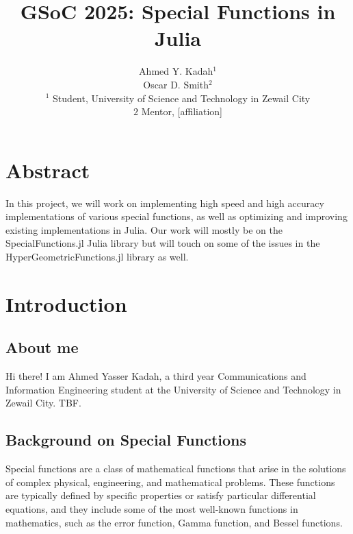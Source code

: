 \documentclass{article}
\title{GSoC 2025: Special Functions in Julia }
\author{Ahmed Y. Kadah$^1$  
\\Oscar D. Smith$^2$ 
\\$^1$ Student, University of Science and Technology in Zewail City
\\ $2$ Mentor, [affiliation]}
\date{}
\theoremstyle{mytheoremstyle}
\theoremstyle{mytheoremstyle}
\theoremstyle{myproblemstyle}
\begin{document}
    \maketitle


  \section*{Abstract}
    In this project, we will work on implementing high speed and high accuracy implementations of various special functions, as well as optimizing and improving existing implementations in Julia.
    Our work will mostly be on the SpecialFunctions.jl Julia library but will touch on some of the issues in the HyperGeometricFunctions.jl library as well. 

  \section*{Introduction}
    \subsection*{About me}\label{sub:About} 
      Hi there! I am Ahmed Yasser Kadah, a third year Communications and Information Engineering student at the University of Science and Technology in Zewail City. TBF. 

    \subsection*{Background on Special Functions}\label{sub:Background } %
   Special functions are a class of mathematical functions that arise in the solutions of complex physical, engineering, and mathematical problems.
   These functions are typically defined by specific properties or satisfy particular differential equations, and they include some of the most well-known functions in mathematics, such as the error function, Gamma function, and Bessel functions.
\end{document}
